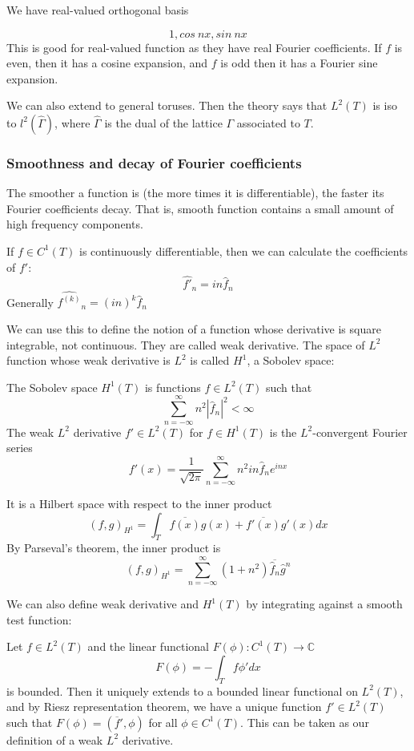 \documentclass[main.tex]{subfiles}
\begin{document}
We have real-valued orthogonal basis 

$$
1, cos\ nx, sin\ nx
$$
This is good for real-valued function as they have real Fourier coefficients. If $f$ is even, then it has a cosine expansion, and $f$ is odd then it has a Fourier sine expansion.

We can also extend to general toruses. Then the theory says that $L^2(T)$ is iso to $l^2(\hat{\Gamma})$, where $\hat{\Gamma}$ is the dual of the lattice $\Gamma$ associated to $T$.

\subsubsection{Smoothness and decay of Fourier coefficients}

The smoother a function is (the more times it is differentiable), the faster its Fourier coefficients decay. That is, smooth function contains a small amount of high frequency components.

If $f \in C^1(T)$ is continuously differentiable, then we can calculate the coefficients of $f'$:
$$
\hat{f'}_n = in\hat{f}_n
$$
Generally $\hat{f^{(k)}}_n= (in)^k \hat{f}_n$

We can use this to define the notion of a function whose derivative is square integrable, not continuous. They are called weak derivative. The space of $L^2$ function whose weak derivative is $L^2$ is called $H^1$, a Sobolev space:

\begin{definition}
The Sobolev space $H^1(T)$ is functions $f \in L^2(T)$ such that 
$$
\sum_{n = -\infty} ^{\infty} n^2 |\hat{f}_n|^2 < \infty
$$
The weak $L^2$ derivative $f' \in L^2(T)$ for $f \in H^1(T)$ is the $L^2$-convergent Fourier series
$$
f'(x) = \frac{1}{\sqrt{2\pi}} \sum_{n = -\infty} ^{\infty} n^2 in \hat{f}_n e^{inx}
$$
\end{definition}

It is a Hilbert space with respect to the inner product 
$$
(f, g)_{H^1} = \int_T \overline{f(x)}g(x) + \overline{f'(x)}g'(x) dx
$$
By Parseval's theorem, the inner product is 
$$
(f,g)_{H^1} = \sum_{n = -\infty} ^{\infty} (1 + n^2)\overline{\hat{f}_n} \hat{g}^n
$$

We can also define weak derivative and $H^1(T)$ by integrating against a smooth test function:

Let $f \in L^2(T)$ and the linear functional $F(\phi): C^1(T) \rightarrow \mathbb{C}$
$$
F(\phi) = - \int_T f\phi' dx
$$
is bounded. Then it uniquely extends to a bounded linear functional on $L^2(T)$, and by Riesz representation theorem, we have a unique function $f' \in L^2(T)$ such that $F(\phi) = (\overline{f}', \phi)$ for all $\phi \in C^1(T)$. This can be taken as our definition of a weak $L^2$ derivative.
\end{document}
